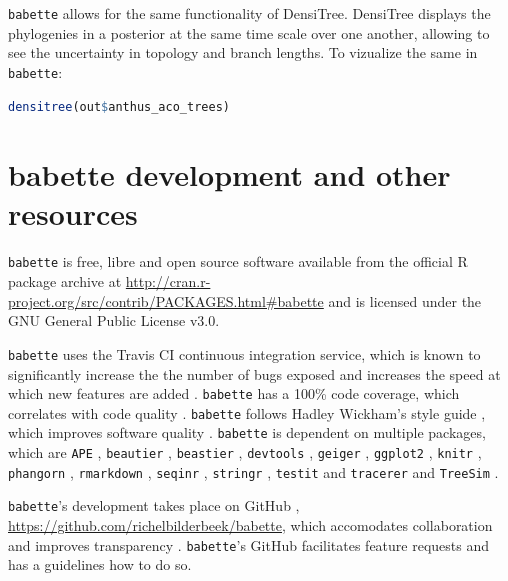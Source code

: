 \documentclass{article}
\begin{document}
\verb;babette; allows for the same functionality of DensiTree.
DensiTree displays the phylogenies in a posterior at the same
time scale over one another, allowing to see the uncertainty in
topology and branch lengths. To vizualize the same in \verb;babette;:

\begin{lstlisting}[language=R, caption=Show posterior phylogenies, label=lst:densitree, floatplacement=H]
densitree(out$anthus_aco_trees)
\end{lstlisting}

\section{babette development and other resources}

\verb;babette; is free, libre and open source software available from the official R package archive at 
\url{http://cran.r-project.org/src/contrib/PACKAGES.html\#babette}
and is licensed under the GNU General Public License v3.0.

\verb;babette; uses the Travis CI \cite{travis} 
continuous integration service, which is known to significantly 
increase the the number of bugs exposed \cite{vasilescu2015} and increases
the speed at which new features are added \cite{vasilescu2015}.
\verb;babette; has a 100\% code coverage, which correlates with code quality \cite{horgan1994,del1995correlation}. 
\verb;babette; follows Hadley Wickham's style guide \cite{style_guide}, which improves software quality \cite{fang2001}.
\verb;babette; is dependent on multiple packages, which are 
\verb;APE; \cite{APE}, 
\verb;beautier; \cite{beautier},
\verb;beastier; \cite{beastier},
\verb;devtools; \cite{devtools},
\verb;geiger; \cite{GEIGER},
\verb;ggplot2; \cite{ggplot2},
\verb;knitr; \cite{knitr},
\verb;phangorn; \cite{phangorn},
\verb;rmarkdown; \cite{rmarkdown},
\verb;seqinr; \cite{seqinr},
\verb;stringr; \cite{stringr},
\verb;testit; \cite{testit} and 
\verb;tracerer; \cite{tracerer} and
\verb;TreeSim; \cite{TreeSim}.

\verb;babette;'s development takes place on GitHub \cite{github},
\url{https://github.com/richelbilderbeek/babette}, 
which accomodates collaboration \cite{perez2016ten} 
and improves transparency \cite{gorgolewski2016practical}.
\verb;babette;'s GitHub facilitates feature requests and has a guidelines how to do so.
\end{document}
